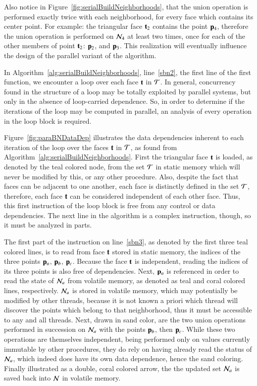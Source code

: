 Also notice in Figure~\ref{fig:serialBuildNeighborhoods}, that the union operation is performed exactly twice with each neighborhood, for every face which contains its center point. For example: the triangular face $\mathbf{t}_2$ contains the point $\mathbf{p}_4$, therefore the union operation is performed on $\mathcal{N}_4$ at least two times, once for each of the other members of point $\mathbf{t}_2$: $\mathbf{p}_2$, and $\mathbf{p}_3$. This realization will eventually influence the design of the parallel variant of the algorithm.

In Algorithm~\ref{alg:serialBuildNeighborhoods}, line~\ref{sbn2}, the first line of the first function, we encounter a loop over each face $\mathbf{t}$ in $\mathcal{T}$. In general, concurrency found in the structure of a loop may be totally exploited by parallel systems, but only in the absence of loop-carried dependence. So, in order to determine if the iterations of the loop may be computed in parallel, an analysis of every operation in the loop block is required.

Figure~\ref{fig:paraBNDataDep} illustrates the data dependencies inherent to each iteration of the loop over the faces $\mathbf{t}$ in $\mathcal{T}$, as found from Algorithm~\ref{alg:serialBuildNeighborhoods}. First the triangular face $\mathbf{t}$ is loaded, as denoted by the teal colored node, from the set $\mathcal{T}$ in static memory which will never be modified by this, or any other procedure. Also, despite the fact that faces can be adjacent to one another, each face is distinctly defined in the set $\mathcal{T}$, therefore, each face $\mathbf{t}$ can be considered independent of each other face. Thus, this first instruction of the loop block is free from any control or data dependencies. The next line in the algorithm is a complex instruction, though, so it must be analyzed in parts.

The first part of the instruction on line~\ref{sbn3}, as denoted by the first three teal colored lines, is to read from face $\mathbf{t}$ stored in static memory, the indices of the three points $\mathbf{p}_a$, $\mathbf{p}_b$, $\mathbf{p}_c$. Because the face $\mathbf{t}$ is independent, reading the indices of its three points is also free of dependencies. Next, $\mathbf{p}_a$ is referenced in order to read the state of $\mathcal{N}_a$ from volatile memory, as denoted as teal and coral colored lines, respectively. $\mathcal{N}_a$ is stored in volatile memory, which may potentially be modified by other threads, because it is not known a priori which thread will discover the points which belong to that neighborhood, thus it must be accessible to any and all threads. Next, drawn in sand color, are the two union operations performed in succession on $\mathcal{N}_a$ with the points $\mathbf{p}_b$, then $\mathbf{p}_c$. While these two operations are themselves independent, being performed only on values currently immutable by other procedures, they do rely on having already read the status of $\mathcal{N}_a$, which indeed does have its own data dependence, hence the sand coloring. Finally illustrated as a double, coral colored arrow, the  the updated set $\mathcal{N}_a$ is saved back into $\mathcal{N}$ in volatile memory.


